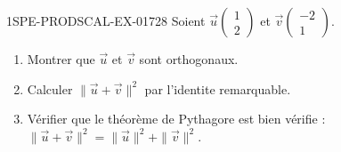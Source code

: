 \begin{exercice}{1SPE-PRODSCAL-EX-017}{2}{8}
Soient $\vec{u}\begin{pmatrix} 1 \\ 2 \end{pmatrix}$ et $\vec{v}\begin{pmatrix} -2 \\ 1 \end{pmatrix}$.
\begin{enumerate}
  \item Montrer que $\vec{u}$ et $\vec{v}$ sont orthogonaux.
  \item Calculer $\|\vec{u} + \vec{v}\|^2$ par l'identite remarquable.
  \item Vérifier que le théorème de Pythagore est bien vérifie : $\|\vec{u} + \vec{v}\|^2 = \|\vec{u}\|^2 + \|\vec{v}\|^2$.
\end{enumerate}
\end{exercice}
